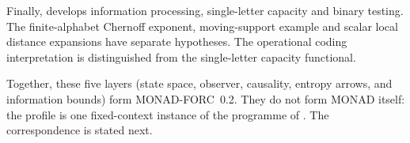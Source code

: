Finally,  develops information processing,
single-letter capacity and binary testing. The finite-alphabet Chernoff
exponent, moving-support example and scalar local distance expansions
have separate hypotheses. The operational coding interpretation is
distinguished from the single-letter capacity functional.

Together, these five layers (state space, observer, causality, entropy
arrows, and information bounds) form MONAD-FORC~0.2.  They do not form
MONAD itself: the profile is one fixed-context instance of the
programme of .  The correspondence is
stated next.


